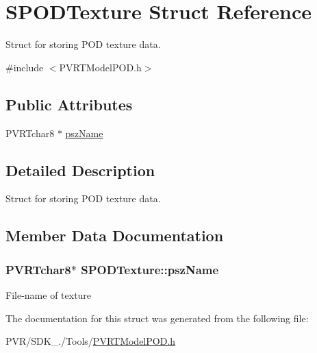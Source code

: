 \hypertarget{struct_s_p_o_d_texture}{\section{S\+P\+O\+D\+Texture Struct Reference}
\label{struct_s_p_o_d_texture}
}


Struct for storing P\+O\+D texture data.  




{\ttfamily \#include $<$P\+V\+R\+T\+Model\+P\+O\+D.\+h$>$}

\subsection*{Public Attributes}
\begin{DoxyCompactItemize}
\item 
P\+V\+R\+Tchar8 $\ast$ \hyperlink{struct_s_p_o_d_texture_ab2c3ef77169d4c564030c6dc8dba0f5b}{psz\+Name}
\end{DoxyCompactItemize}


\subsection{Detailed Description}
Struct for storing P\+O\+D texture data. 



 

\subsection{Member Data Documentation}
\hypertarget{struct_s_p_o_d_texture_ab2c3ef77169d4c564030c6dc8dba0f5b}{
\subsubsection[{psz\+Name}]{\setlength{\rightskip}{0pt plus 5cm}P\+V\+R\+Tchar8$\ast$ S\+P\+O\+D\+Texture\+::psz\+Name}}\label{struct_s_p_o_d_texture_ab2c3ef77169d4c564030c6dc8dba0f5b}
File-\/name of texture 

The documentation for this struct was generated from the following file\+:\begin{DoxyCompactItemize}
\item 
P\+V\+R/\+S\+D\+K\+\_./\+Tools/\hyperlink{_p_v_r_t_model_p_o_d_8h}{P\+V\+R\+T\+Model\+P\+O\+D.\+h}\end{DoxyCompactItemize}
